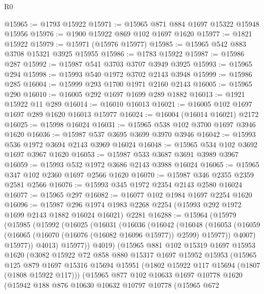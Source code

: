 \begin{lexlean}{R0}
\begin{coremodule}
@15965 := @1793 @15922
@15971 := @15965 @871 @884 @1697 @15322 @15948 @15956
@15976 := @1900 @15922 @869 @102 @1697 @1620
@15977 := @1821 @15922
@15979 := @15971 (@15976 @15977)
@15985 := @15965 @542 @883 @3708 @15321 @3925 @15955
@15986 := @1783 @15922
@15987 := @15986 @287
@15992 := @15987 @541 @3703 @3707 @3949 @3925
@15993 := @15965 @294
@15998 := @15993 @540 @1972 @3702 @2143 @3948
@15999 := @15986 @285
@16004 := @15999 @293 @1700 @1971 @2160 @2143
@16005 := @15965 @290
@16010 := @16005 @292 @1697 @1699 @289 @1882
@16013 := @1921 @15922 @11 @289
@16014 := @16010 @16013
@16021 := @16005 @102 @1697 @1697 @289 @1620 @16013 @15977
@16024 := @16004 (@16014 @16021) @2172
@16025 := @15998 @16024
@16031 := @15965 @538 @102 @3700 @1697 @3946 @1620
@16036 := @15987 @537 @3695 @3699 @3970 @3946
@16042 := @15993 @536 @1972 @3694 @2143 @3969 @16024
@16048 := @15965 @534 @102 @3692 @1697 @3967 @1620
@16053 := @15987 @533 @3687 @3691 @3989 @3967
@16059 := @15993 @532 @1972 @3686 @2143 @3988 @16024
@16065 := @15965 @347 @102 @2360 @1697 @2566 @1620
@16070 := @15987 @346 @2355 @2359 @2581 @2566
@16076 := @15993 @345 @1972 @2354 @2143 @2580 @16024
@16077 := @15965 @297
@16082 := @16077 @102 @1984 @1697 @2254 @1620
@16096 := @15987
    @296
    @1974
    @1983
    @2268
    @2254
    (@15993 @292 @1972 @1699 @2143 @1882 @16024 @16021)
    @2281
@16288 := @15964
    (@15979
      (@15985
        (@15992
          (@16025
            (@16031
              (@16036
                (@16042
                  (@16048
                    (@16053
                      (@16059 (@16065 (@16070 (@16076 (@16082 @16096 @15977)) @2599) @15977))
                      @4007)
                    @15977))
                @4013)
              @15977))
          @4019)
        (@15965
          @881
          @102
          @15319
          @1697
          @15953
          @1620
          (@3082
            @15922
            @72
            @858
            @880
            @15317
            @1697
            @15952
            @15953
            (@15965
              @125
              @879
              @1697
              @15316
              @15694
              @15951
              (@1802 @15922 @117 @15694 (@1807 (@1808 @15922 @117)))
              (@15965
                @877
                @102
                @10633
                @1697
                @10778
                @1620
                (@15942
                  @188
                  @876
                  @10630
                  @10632
                  @10797
                  @10778
                  (@15965
                    @672

\end{coremodule}
\end{lexlean}
